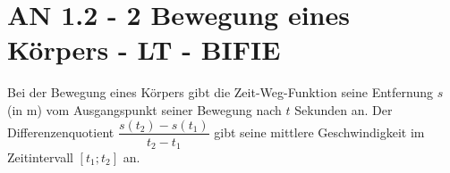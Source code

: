 \section{AN 1.2 - 2 Bewegung eines Körpers - LT - BIFIE}


\begin{beispiel}[AN 1.2]{1} %
Bei der Bewegung eines Körpers gibt die Zeit-Weg-Funktion seine Entfernung $s$ (in m) vom Ausgangspunkt seiner Bewegung nach $t$ Sekunden an. 
Der Differenzenquotient $\dfrac{s(t_2)-s(t_1)}{t_2-t_1}$ gibt seine mittlere Geschwindigkeit im Zeitintervall $[t_1;t_2]$ an.

\end{beispiel}